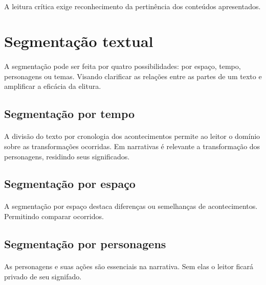 \paragraph{}
A leitura crítica exige reconhecimento da pertinência dos conteúdos apresentados.

\section{Segmentação textual}

\paragraph{}
A segmentação pode ser feita por quatro possibilidades: por espaço, tempo, personagens ou temas. Visando clarificar as relações entre as partes de um texto e amplificar a eficácia da elitura.

\subsection{Segmentação por tempo}

\paragraph{}

A divisão do texto por cronologia dos acontecimentos permite ao leitor o domínio sobre as transformações ocorridas. Em narrativas é relevante a transformação dos personagens, residindo seus significados.

\subsection{Segmentação por espaço}

\paragraph{}
A segmentação por espaço destaca diferenças ou semelhanças de acontecimentos. Permitindo comparar ocorridos.

\subsection{Segmentação por personagens}

\paragraph{}
As personagens e suas ações são essenciais na narrativa. Sem elas o leitor ficará privado de seu signifado.

